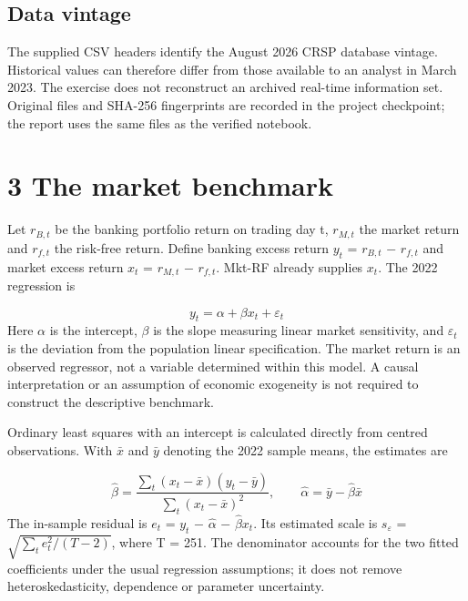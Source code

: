 \documentclass[11pt,a4paper]{article}
\begin{document}
\subsection*{Data vintage}
The supplied CSV headers identify the August 2026 CRSP database vintage. Historical values can therefore differ from those available to an analyst in March 2023. The exercise does not reconstruct an archived real-time information set. Original files and SHA-256 fingerprints are recorded in the project checkpoint; the report uses the same files as the verified notebook.

\clearpage
\section*{3 The market benchmark}
Let $r_{B,t}$ be the banking portfolio return on trading day t, $r_{M,t}$ the market return and $r_{f,t}$ the risk-free return. Define banking excess return $y_t$ = $r_{B,t}$ $-$ $r_{f,t}$ and market excess return $x_t$ = $r_{M,t}$ $-$ $r_{f,t}$. Mkt-RF already supplies $x_t$. The 2022 regression is

\begin{equation}y_t=\alpha+\beta x_t+\varepsilon_t\label{eq:model}\end{equation}
Here $\alpha$ is the intercept, $\beta$ is the slope measuring linear market sensitivity, and $\varepsilon_t$ is the deviation from the population linear specification. The market return is an observed regressor, not a variable determined within this model. A causal interpretation or an assumption of economic exogeneity is not required to construct the descriptive benchmark.

Ordinary least squares with an intercept is calculated directly from centred observations. With $\bar x$ and $\bar y$ denoting the 2022 sample means, the estimates are

\begin{equation}\hat\beta=\frac{\sum_t(x_t-\bar{x})(y_t-\bar{y})}{\sum_t(x_t-\bar{x})^2},\qquad\hat\alpha=\bar{y}-\hat\beta\bar{x}\label{eq:ols}\end{equation}
The in-sample residual is $e_t$ = $y_t$ $-$ $\widehat\alpha$ $-$ $\widehat\beta$$x_t$. Its estimated scale is $s_\varepsilon$ = $\sqrt{\sum_t e_t^2/(T-2)}$, where T = 251. The denominator accounts for the two fitted coefficients under the usual regression assumptions; it does not remove heteroskedasticity, dependence or parameter uncertainty.
\end{document}
